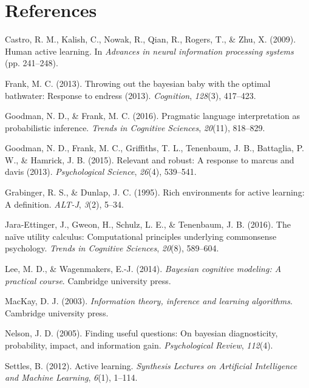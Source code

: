 \documentclass[10pt, letterpaper]{article}
\begin{document}
\section{References}\label{references}

\setlength{\parindent}{-0.1in} \setlength{\leftskip}{0.125in}

\noindent

\hypertarget{refs}{}
\hypertarget{ref-castro2009human}{}
Castro, R. M., Kalish, C., Nowak, R., Qian, R., Rogers, T., \& Zhu, X.
(2009). Human active learning. In \emph{Advances in neural information
processing systems} (pp. 241--248).

\hypertarget{ref-frank2013throwing}{}
Frank, M. C. (2013). Throwing out the bayesian baby with the optimal
bathwater: Response to endress (2013). \emph{Cognition}, \emph{128}(3),
417--423.

\hypertarget{ref-goodman2016}{}
Goodman, N. D., \& Frank, M. C. (2016). Pragmatic language
interpretation as probabilistic inference. \emph{Trends in Cognitive
Sciences}, \emph{20}(11), 818--829.

\hypertarget{ref-goodman2015relevant}{}
Goodman, N. D., Frank, M. C., Griffiths, T. L., Tenenbaum, J. B.,
Battaglia, P. W., \& Hamrick, J. B. (2015). Relevant and robust: A
response to marcus and davis (2013). \emph{Psychological Science},
\emph{26}(4), 539--541.

\hypertarget{ref-grabinger1995rich}{}
Grabinger, R. S., \& Dunlap, J. C. (1995). Rich environments for active
learning: A definition. \emph{ALT-J}, \emph{3}(2), 5--34.

\hypertarget{ref-jara2016}{}
Jara-Ettinger, J., Gweon, H., Schulz, L. E., \& Tenenbaum, J. B. (2016).
The naïve utility calculus: Computational principles underlying
commonsense psychology. \emph{Trends in Cognitive Sciences},
\emph{20}(8), 589--604.

\hypertarget{ref-lee2014bayesian}{}
Lee, M. D., \& Wagenmakers, E.-J. (2014). \emph{Bayesian cognitive
modeling: A practical course}. Cambridge university press.

\hypertarget{ref-mackay2003}{}
MacKay, D. J. (2003). \emph{Information theory, inference and learning
algorithms}. Cambridge university press.

\hypertarget{ref-nelson2005}{}
Nelson, J. D. (2005). Finding useful questions: On bayesian
diagnosticity, probability, impact, and information gain.
\emph{Psychological Review}, \emph{112}(4).

\hypertarget{ref-settles2012active}{}
Settles, B. (2012). Active learning. \emph{Synthesis Lectures on
Artificial Intelligence and Machine Learning}, \emph{6}(1), 1--114.
\end{document}
